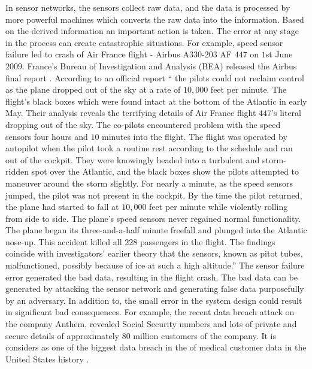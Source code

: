 	In sensor networks, the sensors collect raw data, and the data is processed by more powerful machines which converts the raw data into the information.
	Based on the derived information an important action is taken.
	The error at any stage in the process can create catastrophic situations.
	For example, speed sensor failure led to crash of Air France flight - Airbus A$330$-$203$ AF $447$ on $1$st June $2009$.
	France's Bureau of Investigation and Analysis (BEA) released the Airbus final report \cite{final-report}.
	According to an official report `` the pilots could not reclaim control as the plane dropped out of the sky at a rate of $10,000$ feet per minute.
	The flight's black boxes which were found intact at the bottom of the Atlantic in early May.
	Their analysis reveals the terrifying details of Air France flight $447$'s literal dropping out of the sky.
	The co-pilots encountered problem with the speed sensors four hours and $10$ minutes into the flight. 
	The flight was operated by autopilot when the pilot took a routine rest according to the schedule and ran out of the cockpit. 
	They were knowingly headed into a turbulent and storm-ridden spot over the Atlantic, and the black boxes show the pilots attempted to maneuver around the storm slightly.
	For nearly a minute, as the speed sensors jumped, the pilot was not present in the cockpit. 
	By the time the pilot returned, the plane had started to fall at $10,000$ feet per minute while violently rolling from side to side.
	The plane's speed sensors never regained normal functionality.
	The plane began its three-and-a-half minute freefall and plunged into the Atlantic nose-up.
	This accident killed all 228 passengers in the flight.
	The findings coincide with investigators' earlier theory that the sensors, known as pitot tubes, malfunctioned, possibly because of ice at such a high altitude.''
	The sensor failure error generated the bad data, resulting in the flight crash.
	The bad data can be generated by attacking the sensor network and generating false data purposefully by an adversary. 
	In addition to, the small error in the system design could result in significant bad consequences.
	For example, the recent data breach attack on the company Anthem, revealed Social Security numbers and lots of private and secure details of approximately 80 million customers of the company.
	It is considers as one of the biggest data breach in the of medical customer data in the United States history \cite{anthem}.

